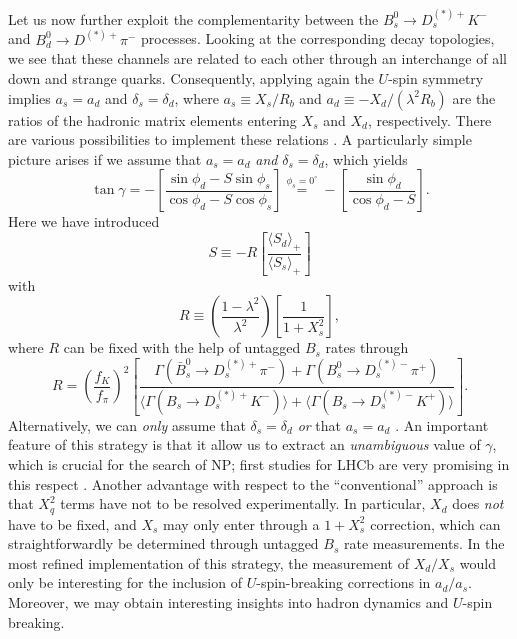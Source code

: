 \documentclass[12pt]{article}
\begin{document}
Let us now further exploit the complementarity between the 
$B_s^0\to D_s^{(\ast)+}K^-$ and $B_d^0\to D^{(\ast)+}\pi^-$ processes.
Looking at the corresponding decay topologies, we see that
these channels are related to each other through an interchange of 
all down and strange quarks. Consequently, applying again the $U$-spin 
symmetry implies $a_s=a_d$ and $\delta_s=\delta_d$, where $a_s\equiv X_s/R_b$ 
and $a_d\equiv -X_d/(\lambda^2 R_b)$ are the ratios of the hadronic matrix elements 
entering $X_s$ and $X_d$, respectively. There are various possibilities 
to implement these relations \cite{RF-gam-ca}. A particularly simple
picture arises if we assume that $a_s=a_d$ {\it and} $\delta_s=\delta_d$, 
which yields
\begin{equation}
\tan\gamma=-\left[\frac{\sin\phi_d-S
\sin\phi_s}{\cos\phi_d-S\cos\phi_s}
\right]\stackrel{\phi_s=0^\circ}{=}
-\left[\frac{\sin\phi_d}{\cos\phi_d-S}\right].
\end{equation}
Here we have introduced
\begin{equation}
S\equiv-R\left[\frac{\langle S_d\rangle_+}{\langle S_s\rangle_+}\right]
\end{equation}
with
\begin{equation}
R\equiv\left(\frac{1-\lambda^2}{\lambda^2}\right)
\left[\frac{1}{1+X_s^2}\right],
\end{equation}
where $R$ can be fixed with the help of untagged $B_s$ rates through
\begin{equation}
R=\left(\frac{f_K}{f_\pi}\right)^2 \left[
\frac{\Gamma(\bar B^0_s \to D_s^{(\ast)+}\pi^-)+
\Gamma(B^0_s\to D_s^{(\ast)-}\pi^+)}{\langle\Gamma(B_s\to D_s^{(\ast)+}K^-)
\rangle+\langle\Gamma(B_s\to D_s^{(\ast)-}K^+)\rangle}\right].
\end{equation}
Alternatively, we can {\it only} assume that $\delta_s=\delta_d$ {\it or} 
that $a_s=a_d$ \cite{RF-gam-ca}. An important feature of this strategy
is that it allow us to extract an {\it unambiguous} value of $\gamma$, 
which is crucial for the search of NP; first studies for LHCb are very promising 
in this respect \cite{wilkinson-CKM}.
Another advantage with respect to the ``conventional'' approach is that 
$X_q^2$ terms have not to be resolved experimentally. In 
particular, $X_d$ does {\it not} have to be fixed, and $X_s$ may only enter 
through a $1+X_s^2$ correction, which can straightforwardly be determined 
through untagged $B_s$ rate measurements. In the most refined implementation 
of this strategy, the measurement of $X_d/X_s$ would only be interesting for 
the inclusion of $U$-spin-breaking corrections in $a_d/a_s$. Moreover, we may 
obtain interesting insights into hadron dynamics and $U$-spin breaking. 
\end{document}
